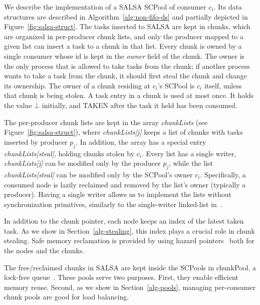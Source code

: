 We describe the implementation of a SALSA SCPool of consumer $c_i$.
Its data structures are described in Algorithm~\ref{alg:non-fifo-ds} and partially depicted in Figure~\ref{fig:salsa-struct}. The tasks inserted to SALSA are kept in chunks, which are organized in per-producer chunk lists, and only the producer mapped to a given list can insert a task to a chunk in that list. Every chunk is owned by a single consumer whose id is kept in the \emph{owner} field of the chunk.
The owner is the only process that is allowed to take tasks from the chunk; if another process wants to take a task from the chunk, it should first steal the chunk and change its ownership. The owner of a chunk
residing at $c_i$'s SCPool is $c_i$ itself, unless that chunk is being stolen. A task entry in a chunk is used at most once. It holds the value $\bot$ initially, and TAKEN after the task it held has been consumed.

The per-producer chunk lists are kept in the array \emph{chunkLists} (see Figure~\ref{fig:salsa-struct}), where \emph{chunkLists[j]} keeps a list of chunks with tasks inserted by producer $p_j$. In addition, the array has a special entry \emph{chunkLists[steal]}, holding chunks stolen by $c_i$. Every list has a single writer, \emph{chunkLists[j]} can be modified only by the producer $p_j$, while the list \emph{chunkLists[steal]} can be modified only by the SCPool's owner $c_i$. Specifically, a consumed node is lazily reclaimed and removed by the list's owner (typically a producer). Having a single writer allows us to implement the lists without synchronization primitives, similarly to the single-writer linked-list in~\cite{Michael:2004:HPS:987524.987595}.

In addition to the chunk pointer, each node keeps an index of the latest taken task. As we show in Section~\ref{alg-stealing}, this index plays a crucial role in chunk stealing. Safe memory reclamation is provided by using hazard pointers~\cite{Michael:2004:HPS:987524.987595} both for the nodes and the chunks.

The free/reclaimed chunks in SALSA are kept inside the SCPools in chunkPool, a lock-free queue~\cite{Michael:1996:SFP:248052.248106}. These pools serve two purposes. First, they enable efficient memory reuse. Second, as we show in Section~\ref{alg-pools}, managing per-consumer chunk pools are good for load balancing. 